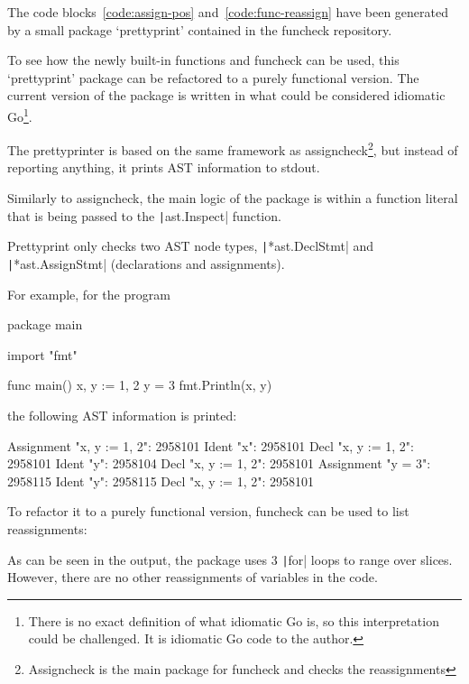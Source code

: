 The code blocks~\ref{code:assign-pos} and~\ref{code:func-reassign} have been
generated by a small package `prettyprint' contained in the funcheck repository.

To see how the newly built-in functions and funcheck can be used, this `prettyprint' package
can be refactored to a purely functional version.
The current version of the package is written in what could be considered idiomatic
Go\footnote{
	There is no exact definition of what idiomatic Go is, so this interpretation
	could be challenged. It is idiomatic Go code to the author.
}.


The prettyprinter is based on the same framework as assigncheck\footnote{Assigncheck
is the main package for funcheck and checks the reassignments}, but instead
of reporting anything, it prints AST information to \gls{stdout}.

Similarly to assigncheck, the main logic of the package is within a
function literal that is being passed to the \texttt|ast.Inspect|
function.

Prettyprint only checks two AST node types, \texttt|*ast.DeclStmt|
and \texttt|*ast.AssignStmt| (declarations and assignments).

For example, for the program
\begin{gocode}
package main

import "fmt"

func main() {
	x, y := 1, 2
	y = 3
	fmt.Println(x, y)
}
\end{gocode}
the following AST information is printed:

\begin{gocode}
Assignment "x, y := 1, 2": 2958101
		Ident "x": 2958101
				Decl "x, y := 1, 2": 2958101
		Ident "y": 2958104
				Decl "x, y := 1, 2": 2958101
Assignment "y = 3": 2958115
		Ident "y": 2958115
				Decl "x, y := 1, 2": 2958101
\end{gocode}

To refactor it to a purely functional version, funcheck can be used to
list reassignments:

As can be seen in the output, the package uses 3 \texttt|for| loops to range over
slices. However, there are no other reassignments of variables in the code.

